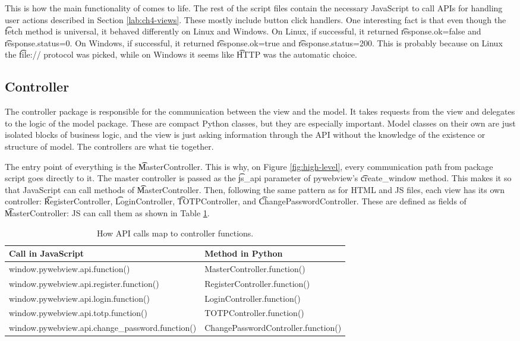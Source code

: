 This is how the main functionality of \app{} comes to life.
The rest of the script files contain the necessary JavaScript to call APIs for handling user actions described in Section \ref{lab:ch4-views}.
These mostly include button click handlers.
One interesting fact is that even though the \t{fetch} method is universal, it behaved differently on Linux and Windows.
On Linux, if successful, it returned \t{response.ok=false} and \t{response.status=0}.
On Windows, if successful, it returned \t{response.ok=true} and \t{response.status=200}.
This is probably because on Linux the \t{file://} protocol was picked, while on Windows it seems like \t{HTTP} was the automatic choice.


\subsection{Controller} \label{lab:ch4-controller}

The controller package is responsible for the communication between the view and the model.
It takes requests from the view and delegates to the logic of the model package.
These are compact Python classes, but they are especially important.
Model classes on their own are just isolated blocks of business logic, and the view is just asking information through the API without the knowledge of the existence or structure of model.
The controllers are what tie \app{} together.

The entry point of everything is the \t{MasterController}.
This is why, on Figure \ref{fig:high-level}, every communication path from package script goes directly to it.
The master controller is passed as the \t{js\_api} parameter of pywebview's \t{create\_window} method.
This makes it so that JavaScript can call methods of \t{MasterController}.
Then, following the same pattern as for HTML and JS files, each view has its own controller: \t{RegisterController}, \t{LoginController}, \t{TOTPController}, and \t{ChangePasswordController}.
These are defined as fields of \t{MasterController}: JS can call them as shown in Table \ref{tab:api}.

\begin{table}[htbp]
\begin{tabular}{|l|l|}
\hline
\textbf{Call in JavaScript}                      & \textbf{Method in Python}           \\ \hline
window.pywebview.api.function()                  & MasterController.function()         \\ \hline
window.pywebview.api.register.function()         & RegisterController.function()       \\ \hline
window.pywebview.api.login.function()            & LoginController.function()          \\ \hline
window.pywebview.api.totp.function()             & TOTPController.function()           \\ \hline
window.pywebview.api.change\_password.function() & ChangePasswordController.function() \\ \hline
\end{tabular}
\caption{How API calls map to controller functions.}
\label{tab:api}
\end{table}

